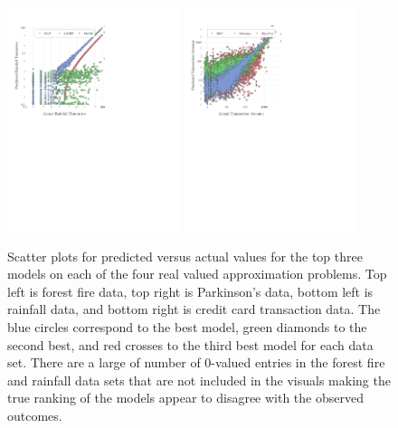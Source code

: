 \begin{figure}[h]
  \includegraphics[width=0.45\textwidth,]{Figures/NA/scatter_weather.pdf}
  \hspace{.6cm}
  \includegraphics[width=0.45\textwidth,]{Figures/NA/scatter_creditcard.pdf}
  \vspace{.3cm}

  \caption{Scatter plots for predicted versus actual values for the
    top three models on each of the four real valued approximation
    problems. Top left is forest fire data, top right is Parkinson's
    data, bottom left is rainfall data, and bottom right is credit
    card transaction data. The blue circles correspond to the best
    model, green diamonds to the second best, and red crosses to the
    third best model for each data set. There are a large of number of
    0-valued entries in the forest fire and rainfall data sets that
    are not included in the visuals making the true ranking of the
    models appear to disagree with the observed outcomes.}
  \label{fig:scatter_plots}
\end{figure}


